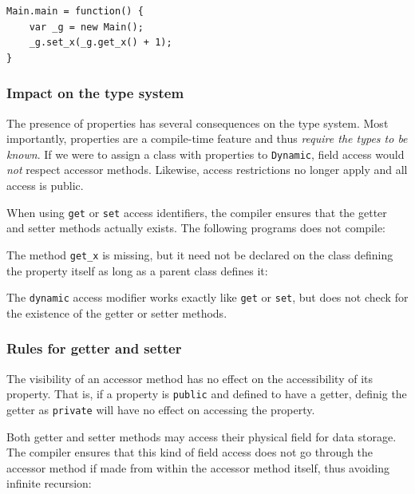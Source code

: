 \documentclass{article}
\newcommand{\type}[1]{\texttt{#1}}
\newcommand{\expr}[1]{\texttt{#1}}
\newcommand{\haxe}[2][]{%
}
\begin{document}
\begin{lstlisting}
Main.main = function() {
	var _g = new Main();
	_g.set_x(_g.get_x() + 1);
}
\end{lstlisting}



\subsubsection{Impact on the type system}

The presence of properties has several consequences on the type system. Most importantly, properties are a compile-time feature and thus \emph{require the types to be known}. If we were to assign a class with properties to \type{Dynamic}, field access would \emph{not} respect accessor methods. Likewise, access restrictions no longer apply and all access is public.

When using \expr{get} or \expr{set} access identifiers, the compiler ensures that the getter and setter methods actually exists. The following programs does not compile:

\haxe{assets/Property4.hx}

The method \expr{get_x} is missing, but it need not be declared on the class defining the property itself as long as a parent class defines it:

\haxe{assets/Property5.hx}

The \expr{dynamic} access modifier works exactly like \expr{get} or \expr{set}, but does not check for the existence of the getter or setter methods.  


\subsubsection{Rules for getter and setter}

The visibility of an accessor method has no effect on the accessibility of its property. That is, if a property is \expr{public} and defined to have a getter, definig the getter as \expr{private} will have no effect on accessing the property.   


Both getter and setter methods may access their physical field for data storage. The compiler ensures that this kind of field access does not go through the accessor method if made from within the accessor method itself, thus avoiding infinite recursion:
\end{document}
